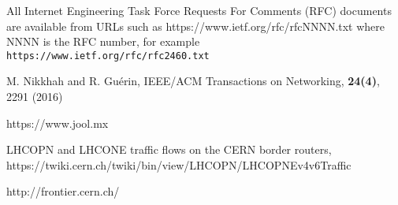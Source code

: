 \begin{thebibliography}{}

All Internet Engineering Task Force Requests For Comments (RFC) documents are available
from URLs such as https://www.ietf.org/rfc/rfcNNNN.txt where NNNN is the RFC number, for example {\tt https://www.ietf.org/rfc/rfc2460.txt}

M. Nikkhah and R. Gu\'erin, 
IEEE/ACM Transactions on Networking, {\bf 24(4)}, 2291 (2016)

https://www.jool.mx


LHCOPN and LHCONE traffic flows on the CERN border routers, 
https://twiki.cern.ch/twiki/bin/view/LHCOPN/LHCOPNEv4v6Traffic


http://frontier.cern.ch/








\end{thebibliography}
